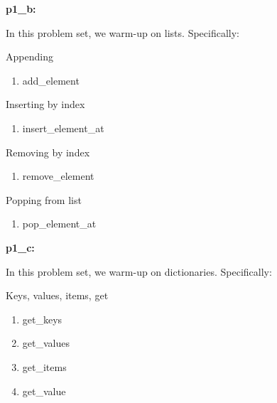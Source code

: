 \documentclass{hw}
\begin{document}
\begin{problem}
\textbf{p1\_b:}

In this problem set, we warm-up on lists. Specifically:

\begin{subproblem}
Appending
\begin{enumerate}
    \item add\_element
\end{enumerate}
\end{subproblem}

\begin{subproblem}
Inserting by index
\begin{enumerate}
    \item insert\_element\_at
\end{enumerate}
\end{subproblem}

\begin{subproblem}
Removing by index
\begin{enumerate}
    \item remove\_element
\end{enumerate}
\end{subproblem}

\begin{subproblem}
Popping from list
\begin{enumerate}
    \item pop\_element\_at
\end{enumerate}
\end{subproblem}

\end{problem}

\begin{problem}
\textbf{p1\_c:}

In this problem set, we warm-up on dictionaries. Specifically:

\begin{subproblem}
Keys, values, items, get
\begin{enumerate}
    \item get\_keys
    \item get\_values
    \item get\_items
    \item get\_value
\end{enumerate}
\end{subproblem}

\end{problem}
\end{document}
